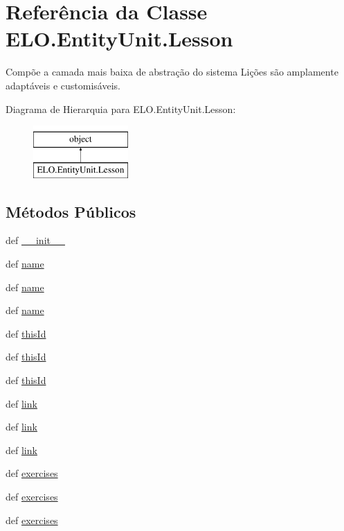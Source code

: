 \hypertarget{classELO_1_1EntityUnit_1_1Lesson}{\section{Referência da Classe E\-L\-O.\-Entity\-Unit.\-Lesson}
\label{dc/d13/classELO_1_1EntityUnit_1_1Lesson}
}


Compõe a camada mais baixa de abstração do sistema Lições são amplamente adaptáveis e customisáveis.  


Diagrama de Hierarquia para E\-L\-O.\-Entity\-Unit.\-Lesson\-:\begin{figure}[H]
\begin{center}
\leavevmode
\includegraphics[height=2.000000cm]{dc/d13/classELO_1_1EntityUnit_1_1Lesson}
\end{center}
\end{figure}
\subsection*{Métodos Públicos}
\begin{DoxyCompactItemize}
\item 
def \hyperlink{classELO_1_1EntityUnit_1_1Lesson_a263c8aacf2bb8a0489283177c0091a67}{\-\_\-\-\_\-init\-\_\-\-\_\-}
\item 
def \hyperlink{classELO_1_1EntityUnit_1_1Lesson_a5af62a54f008a391543fd8fabf30edcf}{name}
\item 
def \hyperlink{classELO_1_1EntityUnit_1_1Lesson_a5af62a54f008a391543fd8fabf30edcf}{name}
\item 
def \hyperlink{classELO_1_1EntityUnit_1_1Lesson_a5af62a54f008a391543fd8fabf30edcf}{name}
\item 
def \hyperlink{classELO_1_1EntityUnit_1_1Lesson_a1947d2d6413e7e94c8c524efe271af12}{this\-Id}
\item 
def \hyperlink{classELO_1_1EntityUnit_1_1Lesson_a1947d2d6413e7e94c8c524efe271af12}{this\-Id}
\item 
def \hyperlink{classELO_1_1EntityUnit_1_1Lesson_a1947d2d6413e7e94c8c524efe271af12}{this\-Id}
\item 
def \hyperlink{classELO_1_1EntityUnit_1_1Lesson_a8560623b79e4379c2ba74aaf678a4764}{link}
\item 
def \hyperlink{classELO_1_1EntityUnit_1_1Lesson_a8560623b79e4379c2ba74aaf678a4764}{link}
\item 
def \hyperlink{classELO_1_1EntityUnit_1_1Lesson_a8560623b79e4379c2ba74aaf678a4764}{link}
\item 
def \hyperlink{classELO_1_1EntityUnit_1_1Lesson_a49ad3f9952188497a01afdd31db8000c}{exercises}
\item 
def \hyperlink{classELO_1_1EntityUnit_1_1Lesson_a49ad3f9952188497a01afdd31db8000c}{exercises}
\item 
def \hyperlink{classELO_1_1EntityUnit_1_1Lesson_a49ad3f9952188497a01afdd31db8000c}{exercises}
\end{DoxyCompactItemize}
